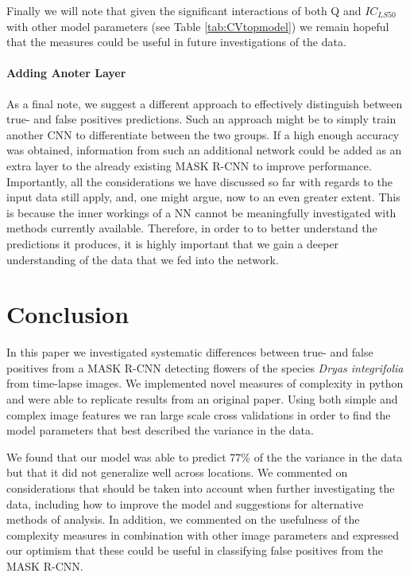 \documentclass[12pt]{article}
\begin{document}
Finally we will note that given the significant interactions of both Q and $IC_{LS50}$ with other model parameters (see Table \ref{tab:CVtopmodel}) we remain hopeful that the measures could be useful in future investigations of the data.

\paragraph{Adding Anoter Layer}
As a final note, we suggest a different approach to effectively distinguish between true- and false positives predictions. Such an approach might be to simply train another CNN to differentiate between the two groups. If a high enough accuracy was obtained, information from such an additional network could be added as an extra layer to the already existing MASK R-CNN to improve performance. Importantly, all the considerations we have discussed so far with regards to the input data still apply, and, one might argue, now to an even greater extent. This is because the inner workings of a NN cannot be meaningfully investigated with methods currently available. Therefore, in order to to better understand the predictions it produces, it is highly important that we gain a deeper understanding of the data that we fed into the network.

\section{Conclusion}
In this paper we investigated systematic differences between true- and false positives from a MASK R-CNN detecting flowers of the species \textit{Dryas integrifolia} from time-lapse images. We implemented novel measures of complexity in python and were able to replicate results from an original paper. Using both simple and complex image features we ran large scale cross validations in order to find the model parameters that best described the variance in the data. 

We found that our model was able to predict 77\% of the the variance in the data but that it did not generalize well across locations. We commented on considerations that should be taken into account when further investigating the data, including how to improve the model and suggestions for alternative methods of analysis. In addition, we commented on the usefulness of the complexity measures in combination with other image parameters and expressed our optimism that these could be useful in classifying false positives from the MASK R-CNN.
\end{document}
